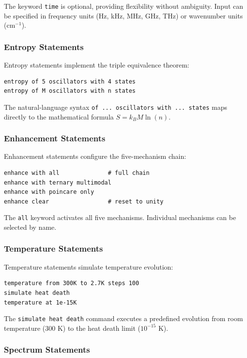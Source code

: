 \documentclass[twocolumn,10pt]{article}
\begin{document}
The keyword \texttt{time} is optional, providing flexibility without ambiguity. Input can be specified in frequency units (Hz, kHz, MHz, GHz, THz) or wavenumber units (cm$^{-1}$).

\subsubsection{Entropy Statements}

Entropy statements implement the triple equivalence theorem:
\begin{lstlisting}
entropy of 5 oscillators with 4 states
entropy of M oscillators with n states
\end{lstlisting}

The natural-language syntax \texttt{of ... oscillators with ... states} maps directly to the mathematical formula $S = k_B M \ln(n)$.

\subsubsection{Enhancement Statements}

Enhancement statements configure the five-mechanism chain:
\begin{lstlisting}
enhance with all              # full chain
enhance with ternary multimodal
enhance with poincare only
enhance clear                 # reset to unity
\end{lstlisting}

The \texttt{all} keyword activates all five mechanisms. Individual mechanisms can be selected by name.

\subsubsection{Temperature Statements}

Temperature statements simulate temperature evolution:
\begin{lstlisting}
temperature from 300K to 2.7K steps 100
simulate heat death
temperature at 1e-15K
\end{lstlisting}

The \texttt{simulate heat death} command executes a predefined evolution from room temperature (300 K) to the heat death limit ($10^{-15}$ K).

\subsubsection{Spectrum Statements}
\end{document}
